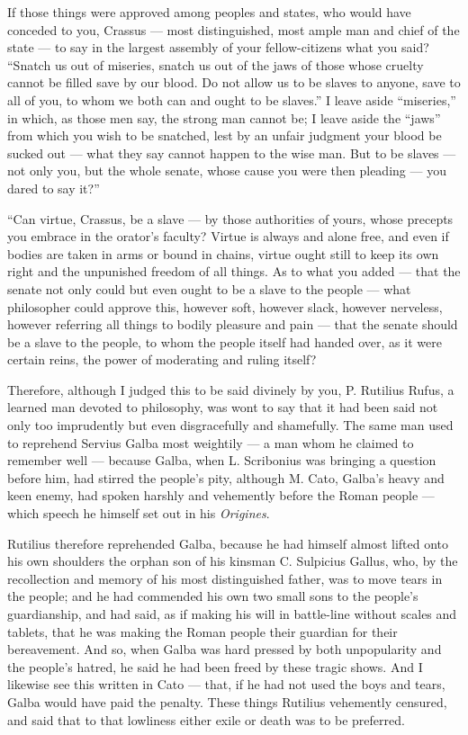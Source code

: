  If those things were approved among peoples and states, who would have conceded to you, Crassus — most distinguished, most ample man and chief of the state — to say in the largest assembly of your fellow-citizens what you said? ``Snatch us out of miseries, snatch us out of the jaws of those whose cruelty cannot be filled save by our blood. Do not allow us to be slaves to anyone, save to all of you, to whom we both can and ought to be slaves.'' I leave aside ``miseries,'' in which, as those men say, the strong man cannot be; I leave aside the ``jaws'' from which you wish to be snatched, lest by an unfair judgment your blood be sucked out — what they say cannot happen to the wise man. But to be slaves — not only you, but the whole senate, whose cause you were then pleading — you dared to say it?''

 ``Can virtue, Crassus, be a slave — by those authorities of yours, whose precepts you embrace in the orator's faculty? Virtue is always and alone free, and even if bodies are taken in arms or bound in chains, virtue ought still to keep its own right and the unpunished freedom of all things. As to what you added — that the senate not only could but even ought to be a slave to the people — what philosopher could approve this, however soft, however slack, however nerveless, however referring all things to bodily pleasure and pain — that the senate should be a slave to the people, to whom the people itself had handed over, as it were certain reins, the power of moderating and ruling itself?

 Therefore, although I judged this to be said divinely by you, P. Rutilius Rufus, a learned man devoted to philosophy, was wont to say that it had been said not only too imprudently but even disgracefully and shamefully. The same man used to reprehend Servius Galba most weightily — a man whom he claimed to remember well — because Galba, when L. Scribonius was bringing a question before him, had stirred the people's pity, although M. Cato, Galba's heavy and keen enemy, had spoken harshly and vehemently before the Roman people — which speech he himself set out in his \textit{Origines}.

 Rutilius therefore reprehended Galba, because he had himself almost lifted onto his own shoulders the orphan son of his kinsman C. Sulpicius Gallus, who, by the recollection and memory of his most distinguished father, was to move tears in the people; and he had commended his own two small sons to the people's guardianship, and had said, as if making his will in battle-line without scales and tablets, that he was making the Roman people their guardian for their bereavement. And so, when Galba was hard pressed by both unpopularity and the people's hatred, he said he had been freed by these tragic shows. And I likewise see this written in Cato — that, if he had not used the boys and tears, Galba would have paid the penalty. These things Rutilius vehemently censured, and said that to that lowliness either exile or death was to be preferred.

